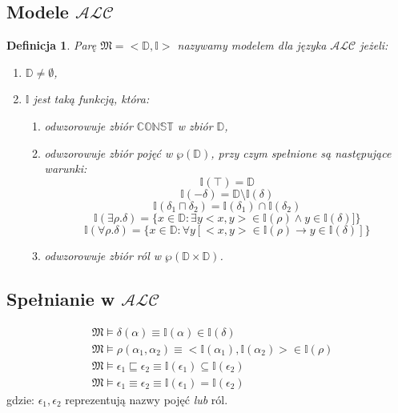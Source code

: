 \documentclass[12pt]{article}
\newtheorem{definicja}{Definicja}
\begin{document}
\subsection{Modele $\mathcal{ALC}$}
%
\begin{definicja}
Parę $\mathfrak{M} = <\mathbb{D}, \mathbb{I}>$ nazywamy modelem dla języka $\mathcal{ALC}$ jeżeli:
%
\begin{enumerate}
\item $\mathbb{D} \neq \emptyset$,
%
\item $\mathbb{I}$ jest taką funkcją, która:
%
\begin{enumerate}
\item odwzorowuje zbiór $\mathbb{CONST}$ w zbiór $\mathbb{D}$,
%
\item odwzorowuje zbiór pojęć w $\wp(\mathbb{D})$, przy czym spełnione są następujące warunki:
$$\mathbb{I}(\top) = \mathbb{D}$$
$$\mathbb{I}(- \delta) = \mathbb{D}\setminus \mathbb{I}(\delta)$$
$$\mathbb{I}(\delta_{1} \sqcap \delta_{2}) = \mathbb{I}(\delta_{1}) \cap \mathbb{I}(\delta_{2})$$
$$\mathbb{I}(\exists \rho . \delta) = \{x \in \mathbb{D} : \exists y <x, y> \in \mathbb{I}(\rho) \land y \in \mathbb{I}(\delta)]\}$$
$$\mathbb{I}(\forall \rho . \delta) = \{x \in \mathbb{D} : \forall y [<x, y> \in \mathbb{I}(\rho) \to y \in \mathbb{I}(\delta)]\}$$
%
\item odwzorowuje zbiór ról  w $\wp(\mathbb{D} \times \mathbb{D})$. %
\end{enumerate}
\end{enumerate}
\end{definicja}
%


\subsection{Spełnianie w $\mathcal{ALC}$}
%
\begin{eqnarray}
\label{sat-AL}
& \mathfrak{M} \vDash \delta(\alpha) \equiv \mathbb{I}(\alpha) \in \mathbb{I}(\delta) \\
%
& \mathfrak{M} \vDash \rho(\alpha_1, \alpha_2) \equiv <\mathbb{I}(\alpha_1), \mathbb{I}(\alpha_2)> \in \mathbb{I}(\rho) \\
%
& \mathfrak{M} \vDash \epsilon_{1} \sqsubseteq \epsilon_{2} \equiv \mathbb{I}(\epsilon_{1}) \subseteq \mathbb{I}(\epsilon_{2}) \\
%
& \mathfrak{M} \vDash \epsilon_{1} \equiv \epsilon_{2} \equiv \mathbb{I}(\epsilon_{1}) = \mathbb{I}(\epsilon_{2})
\end{eqnarray}
%
gdzie: $\epsilon_{1}, \epsilon_{2}$ reprezentują nazwy pojęć \emph{lub} ról.
%
\end{document}
